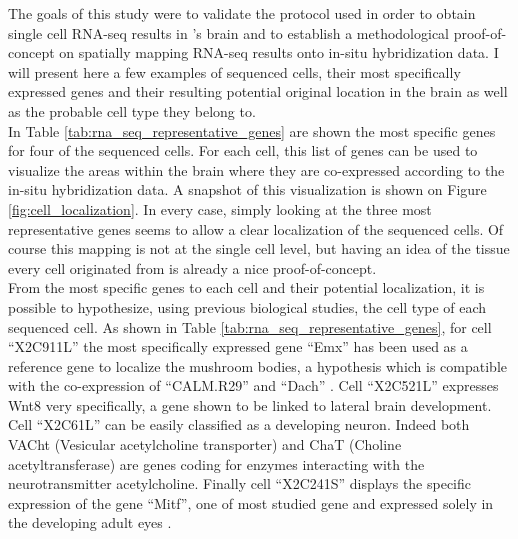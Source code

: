 	The goals of this study were to validate the protocol used in order to obtain single cell RNA-seq results in \platy{}'s brain and to establish a methodological proof-of-concept on spatially mapping RNA-seq results onto in-situ hybridization data. I will present here a few examples of sequenced cells, their most specifically expressed genes and their resulting potential original location in the brain as well as the probable cell type they belong to.\\
	
	In Table \ref{tab:rna_seq_representative_genes} are shown the most specific genes for four of the sequenced cells. For each cell, this list of genes can be used to visualize the areas within the brain where they are co-expressed according to the in-situ hybridization data. A snapshot of this visualization is shown on Figure \ref{fig:cell_localization}. In every case, simply looking at the three most representative genes seems to allow a clear localization of the sequenced cells. Of course this mapping is not at the single cell level, but having an idea of the tissue every cell originated from is already a nice proof-of-concept.\\
	
	From the most specific genes to each cell and their potential localization, it is possible to hypothesize, using previous biological studies, the cell type of each sequenced cell. As shown in Table \ref{tab:rna_seq_representative_genes}, for cell ``X2C911L'' the most specifically expressed gene ``Emx'' has been used as a reference gene to localize the mushroom bodies, a hypothesis which is compatible with the co-expression of ``CALM.R29'' and ``Dach'' \cite{Tomer10}. Cell ``X2C521L'' expresses Wnt8 very specifically, a gene shown to be linked to lateral brain development. Cell ``X2C61L'' can be easily classified as a developing neuron. Indeed both VACht (Vesicular acetylcholine transporter) and ChaT (Choline acetyltransferase) are genes coding for enzymes interacting with the neurotransmitter acetylcholine. Finally cell ``X2C241S'' displays the specific expression of the gene ``Mitf'', one of \platy{} most studied gene and expressed solely in the developing adult eyes \cite{kozmik08,guy08}.
	
